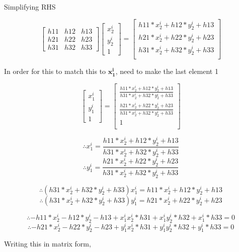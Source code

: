 \documentclass[11pt]{article}
\begin{document}
Simplifying RHS

\[ \begin{bmatrix}
h11 & h12 & h13 \\
h21 & h22 & h23 \\
h31 & h32 & h33 
\end{bmatrix}\begin{bmatrix}
x^i_2 \\
y^i_2 \\
1
\end{bmatrix} = \begin{bmatrix}
h11 * x^i_2 + h12 * y^i_2 + h13\\
h21 * x^i_2 + h22 * y^i_2 + h23\\
h31 * x^i_2 + h32 * y^i_2 + h33\\
\end{bmatrix} \]

In order for this to match this to \(\mathbf{x^i_1}\), need to make the
last element 1

\[\begin{bmatrix}
x^i_1 \\
y^i_1 \\
1
\end{bmatrix} = \begin{bmatrix}
\frac{h11 * x^i_2 + h12 * y^i_2 + h13}{h31 * x^i_2 + h32 * y^i_2 + h33}\\
\frac{h21 * x^i_2 + h22 * y^i_2 + h23}{h31 * x^i_2 + h32 * y^i_2 + h33}\\
1\\
\end{bmatrix}\]

\[\therefore x^i_1 = \frac{h11 * x^i_2 + h12 * y^i_2 + h13}{h31 * x^i_2 + h32 * y^i_2 + h33}\]
\[\therefore y^i_1 = \frac{h21 * x^i_2 + h22 * y^i_2 + h23}{h31 * x^i_2 + h32 * y^i_2 + h33}\]

\[\therefore (h31 * x^i_2 + h32 * y^i_2 + h33)x^i_1 = h11 * x^i_2 + h12 * y^i_2 + h13\]
\[\therefore (h31 * x^i_2 + h32 * y^i_2 + h33)y^i_1 = h21 * x^i_2 + h22 * y^i_2 + h23\]

\[\therefore - h11 * x^i_2 - h12 * y^i_2 - h13 + x^i_1x^i_2 * h31 + x^i_1y^i_2 * h32 + x^i_1 * h33 = 0 \]
\[\therefore - h21 * x^i_2 - h22 * y^i_2 - h23 + y^i_1x^i_2 * h31 + y^i_1y^i_2 * h32 + y^i_1 * h33 = 0 \]

Writing this in matrix form,
\end{document}
